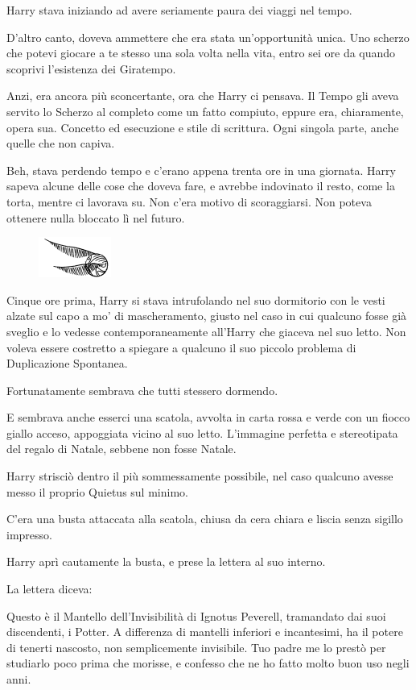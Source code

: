 Harry stava iniziando ad avere seriamente paura dei viaggi nel tempo.

D’altro canto, doveva ammettere che era stata un’opportunità unica. Uno scherzo che potevi giocare a te stesso una sola volta nella vita, entro sei ore da quando scoprivi l’esistenza dei Giratempo.

Anzi, era ancora più sconcertante, ora che Harry ci pensava. Il Tempo gli aveva servito lo Scherzo al completo come un fatto compiuto, eppure era, chiaramente, opera sua. Concetto ed esecuzione e stile di scrittura. Ogni singola parte, anche quelle che non capiva.

Beh, stava perdendo tempo e c’erano appena trenta ore in una giornata. Harry sapeva alcune delle cose che doveva fare, e avrebbe indovinato il resto, come la torta, mentre ci lavorava su. Non c’era motivo di scoraggiarsi. Non poteva ottenere nulla bloccato lì nel futuro.

\begin{figure}[h!]
        \includegraphics[scale=0.4]{boccino.png}
        \centering
\end{figure}

Cinque ore prima, Harry si stava intrufolando nel suo dormitorio con le vesti alzate sul capo a mo’ di mascheramento, giusto nel caso in cui qualcuno fosse già sveglio e lo vedesse contemporaneamente all’Harry che giaceva nel suo letto. Non voleva essere costretto a spiegare a qualcuno il suo piccolo problema di Duplicazione Spontanea.

Fortunatamente sembrava che tutti stessero dormendo.

E sembrava anche esserci una scatola, avvolta in carta rossa e verde con un fiocco giallo acceso, appoggiata vicino al suo letto. L’immagine perfetta e stereotipata del regalo di Natale, sebbene non fosse Natale.

Harry strisciò dentro il più sommessamente possibile, nel caso qualcuno avesse messo il proprio Quietus sul minimo.

C’era una busta attaccata alla scatola, chiusa da cera chiara e liscia senza sigillo impresso.

Harry aprì cautamente la busta, e prese la lettera al suo interno.

La lettera diceva:

Questo è il Mantello dell’Invisibilità di Ignotus Peverell, tramandato dai suoi discendenti, i Potter. A differenza di mantelli inferiori e incantesimi, ha il potere di tenerti nascosto, non semplicemente invisibile. Tuo padre me lo prestò per studiarlo poco prima che morisse, e confesso che ne ho fatto molto buon uso negli anni.

